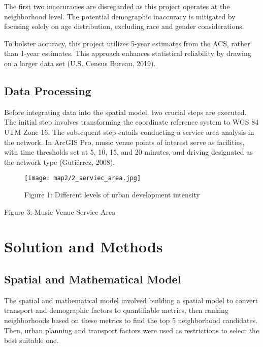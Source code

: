 \documentclass[11pt]{article}
\begin{document}
The first two inaccuracies are disregarded as this project operates at the neighborhood level. The potential demographic inaccuracy is mitigated by focusing solely on age distribution, excluding race and gender considerations.

To bolster accuracy, this project utilizes 5-year estimates from the ACS, rather than 1-year estimates. This approach enhances statistical reliability by drawing on a larger data set (U.S. Census Bureau, 2019).

\subsection{Data Processing}

Before integrating data into the spatial model, two crucial steps are executed. The initial step involves transforming the coordinate reference system to WGS 84 UTM Zone 16. The subsequent step entails conducting a service area analysis in the network. In ArcGIS Pro, music venue points of interest serve as facilities, with time thresholds set at 5, 10, 15, and 20 minutes, and driving designated as the network type (Gutiérrez, 2008).

\begin{figure}[H]
\begin{center}
\centering
\texttt{[image: map2/2\_serviec\_area.jpg]}
\caption{Figure 1: Different levels of urban development intensity}
\label{fig:figure1}
\end{center}
\end{figure}

\begin{center}
\centering
Figure 3: Music Venue Service Area
\end{center}





\section{Solution and Methods}
\subsection{Spatial and Mathematical Model}
The spatial and mathematical model involved building a spatial model to convert transport and demographic factors to quantifiable metrics, then ranking neighborhoods based on these metrics to find the top 5 neighborhood candidates. Then, urban planning and transport factors were used as restrictions to select the best suitable one.
\end{document}
